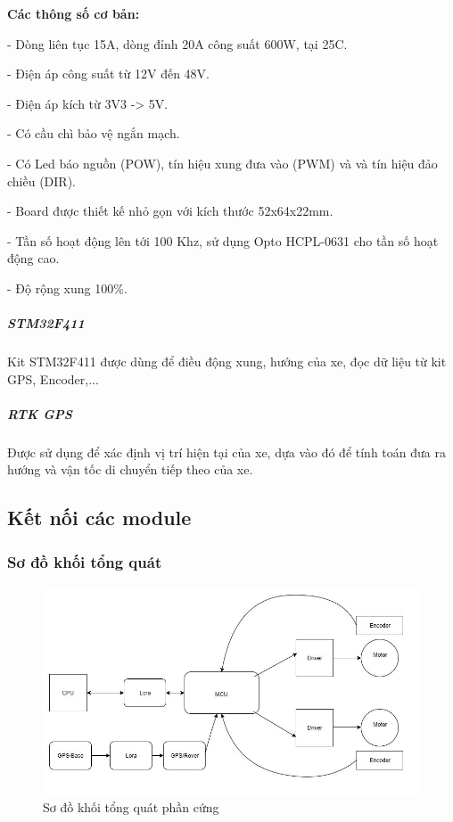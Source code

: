 \documentclass[a4paper, 12pt]{article}
\begin{document}
	\textbf{Các thông số cơ bản:}
	
	- Dòng liên tục 15A, dòng đỉnh 20A công suất 600W, tại 25\degree C.
	
	- Điện áp công suất từ 12V đến 48V.
	
	- Điện áp kích từ 3V3 -> 5V.
	
	- Có cầu chì bảo vệ ngắn mạch.
	
	- Có Led báo nguồn (POW), tín hiệu xung đưa vào (PWM) và và tín hiệu đảo chiều (DIR).
	
	- Board được thiết kế nhỏ gọn với kích thước 52x64x22mm.
	
	- Tần số hoạt động lên tới 100 Khz, sử dụng Opto HCPL-0631 cho tần số hoạt động cao.
	
	- Độ rộng xung 100\%.
	\subparagraph{STM32F411}
	Kit STM32F411 được dùng để điều động xung, hướng của xe, đọc dữ liệu từ kit GPS, Encoder,...
	\subparagraph{RTK GPS}
	Được sử dụng để xác định vị trí hiện tại của xe, dựa vào đó để tính toán đưa ra hướng và vận tốc di chuyển tiếp theo của xe.
	\subsection{Kết nối các module}
	\subsubsection{Sơ đồ khối tổng quát}
	
	\begin{center}
		\begin{figure}[H]
			\begin{center}
				\includegraphics[scale=.5]{images/sodokhoiphancung.jpg}
			\end{center}
			\caption{Sơ đồ khối tổng quát phần cứng}
			\label{refhinh1}
		\end{figure}
	\end{center}
	
\end{document}
